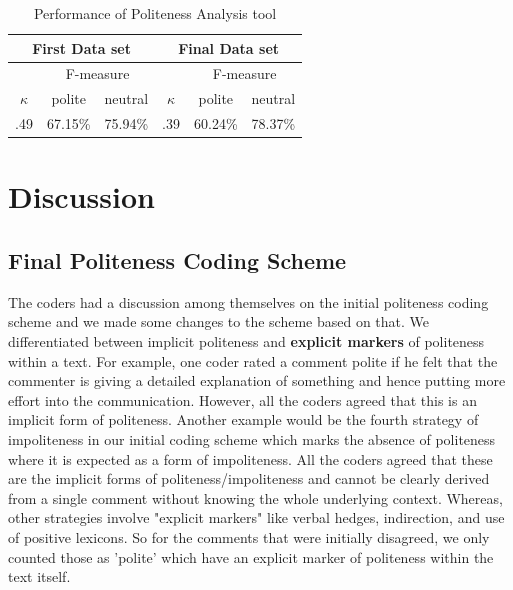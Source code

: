 \vspace{3mm}
\noindent{}

\begin{table}
\centering
\caption{Performance of Politeness Analysis tool}
\label{polresult}
\begin{tabular}{|c|c|c|c|c|c|}
\hline
\multicolumn{3}{|c|}{ First Data set }& \multicolumn{3}{c|}{ Final Data set } \\
\hline
 & \multicolumn{2}{c|}{ F-measure } & & \multicolumn{2}{c|}{ F-measure } \\
 \hline
$\kappa$ & polite & neutral & $\kappa$ & polite & neutral \\
\hline
.49 & 67.15\% & 75.94\% & .39 & 60.24\% & 78.37\%\\
\hline
\end{tabular}
\end{table}

\section{Discussion}
\subsection{Final Politeness Coding Scheme} \label{finalpolscheme}

The coders had a discussion among themselves 
on the initial politeness coding scheme and 
we made some changes to the scheme based on that. 
We differentiated between implicit politeness 
and \textbf{explicit markers} of politeness 
within a text. 
For example, one coder rated a comment polite 
if he felt that the commenter is giving a detailed explanation 
of something and 
hence putting more effort into the communication. 
However, all the coders agreed that 
this is an implicit form of politeness. 
Another example would be the fourth strategy of impoliteness 
in our initial coding scheme which 
marks the absence of politeness where it is expected 
as a form of impoliteness. 
All the coders agreed that 
these are the implicit forms of politeness/impoliteness 
and cannot be clearly derived from a single comment 
without knowing the whole underlying context. 
Whereas, other strategies involve "explicit markers" 
like verbal hedges, indirection, and use of positive lexicons. 
So for the comments that were initially disagreed, 
we only counted those as 'polite' 
which have an explicit marker of politeness 
within the text itself.

